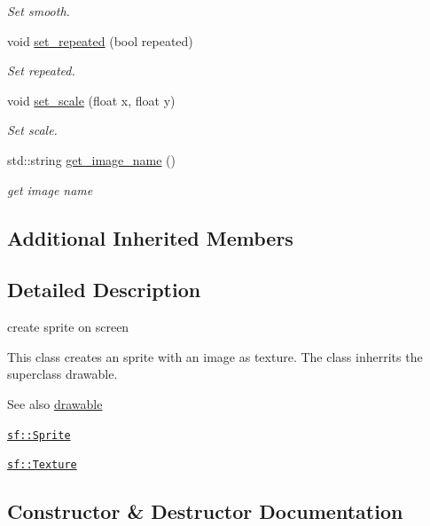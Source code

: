 \begin{DoxyCompactItemize}
\begin{DoxyCompactList}\small\item\em Set smooth. \end{DoxyCompactList}\item 
void \hyperlink{classimage__from__file_abaf0ebde2771171fdf91b55f4f6c5aa6}{set\+\_\+repeated} (bool repeated)
\begin{DoxyCompactList}\small\item\em Set repeated. \end{DoxyCompactList}\item 
void \hyperlink{classimage__from__file_a698cd91783bb6c2211ea5a3702ca60a8}{set\+\_\+scale} (float x, float y)
\begin{DoxyCompactList}\small\item\em Set scale. \end{DoxyCompactList}\item 
std\+::string \hyperlink{classimage__from__file_adb7af19d3d997ab5c0d5b7c8dfe32ded}{get\+\_\+image\+\_\+name} ()
\begin{DoxyCompactList}\small\item\em get image name \end{DoxyCompactList}\end{DoxyCompactItemize}
\subsection*{Additional Inherited Members}


\subsection{Detailed Description}
create sprite on screen 

This class creates an sprite with an image as texture. The class inherrits the superclass drawable.

\begin{DoxySeeAlso}{See also}
\hyperlink{classdrawable}{drawable} 

\href{https://www.sfml-dev.org/documentation/2.0/classsf_1_1Sprite.php }{\tt sf\+::\+Sprite} 

\href{https://www.sfml-dev.org/documentation/2.0/classsf_1_1Texture.php}{\tt sf\+::\+Texture} 
\end{DoxySeeAlso}


\subsection{Constructor \& Destructor Documentation}
\mbox{\label{classimage__from__file_a08fd7ad55a2eb520242e31ff3cdf2663}} 
